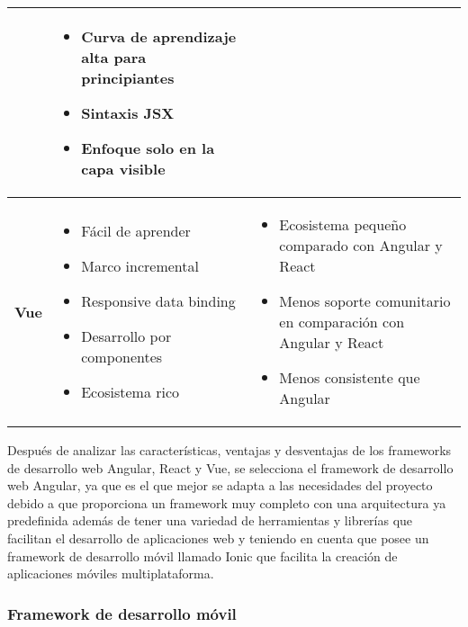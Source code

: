 \begin{spacing}{1}
\begin{center}
\begin{longtable}[c]{ |>{\bfseries}p{} |p{} |p{}|    }
            & \begin{itemize}
                  \item Curva de aprendizaje alta para principiantes
                  \item Sintaxis JSX
                  \item Enfoque solo en la capa visible
            \end{itemize} \\
            \hline
            Vue & \begin{itemize}
                      \item Fácil de aprender
                      \item Marco incremental
                      \item Responsive data binding
                      \item Desarrollo por componentes
                      \item Ecosistema rico
            \end{itemize}
            & \begin{itemize}
                  \item Ecosistema pequeño comparado con Angular y React
                  \item Menos soporte comunitario en comparación con Angular y React
                  \item Menos consistente que Angular
            \end{itemize} \\
            \hline
        \end{longtable}
    \end{center}
\end{spacing}

Después de analizar las características, ventajas y desventajas de los frameworks de desarrollo web Angular, React y Vue, se selecciona el framework de desarrollo web Angular, ya que es el que mejor se adapta a las necesidades del proyecto debido a que proporciona un framework muy completo con una arquitectura ya predefinida además de tener una variedad de herramientas y librerías que facilitan el desarrollo de aplicaciones web y teniendo en cuenta que posee un framework de desarrollo móvil llamado Ionic que facilita la creación de aplicaciones móviles multiplataforma.

\subsubsection{Framework de desarrollo móvil}\label{subsubsec:framework-desarrollo-movil}

